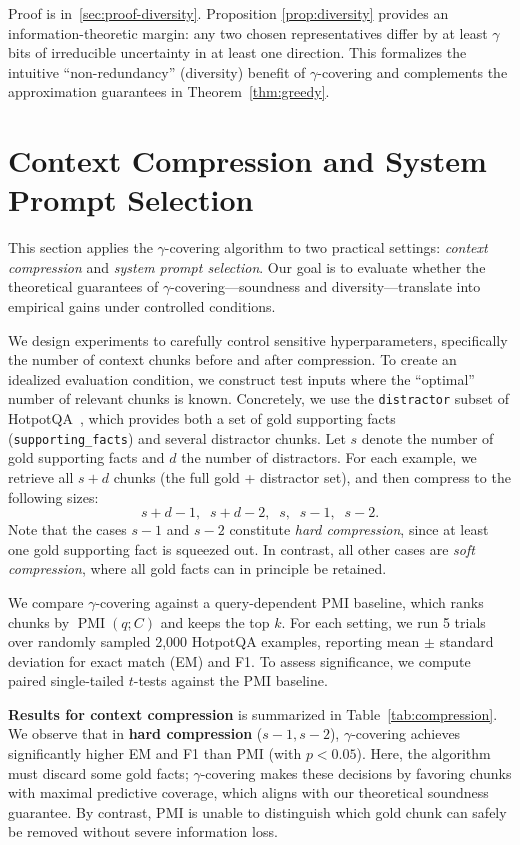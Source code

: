 \documentclass{article} %
\theoremstyle{definition}
\DeclareMathOperator{\PMI}{PMI}
\begin{document}
Proof is in~\ref{sec:proof-diversity}. Proposition \ref{prop:diversity} provides an information-theoretic margin: any two chosen representatives differ by at least $\gamma$ bits of irreducible uncertainty in at least one direction. This formalizes the intuitive “non-redundancy” (diversity) benefit of $\gamma$-covering and complements the approximation guarantees in Theorem~\ref{thm:greedy}.

\section{Context Compression and System Prompt Selection}

This section applies the $\gamma$-covering algorithm to two practical settings: \emph{context compression} and \emph{system prompt selection}. Our goal is to evaluate whether the theoretical guarantees of $\gamma$-covering---soundness and diversity---translate into empirical gains under controlled conditions.

We design experiments to carefully control sensitive hyperparameters, specifically the number of context chunks before and after compression. To create an idealized evaluation condition, we construct test inputs where the ``optimal'' number of relevant chunks is known. Concretely, we use the \texttt{distractor} subset of HotpotQA~\citep{yang2018hotpotqa}, which provides both a set of gold supporting facts (\texttt{supporting\_facts}) and several distractor chunks. Let $s$ denote the number of gold supporting facts and $d$ the number of distractors. For each example, we retrieve all $s+d$ chunks (the full gold + distractor set), and then compress to the following sizes:
\[
s+d-1,\;\; s+d-2,\;\; s,\;\; s-1,\;\; s-2.
\]
Note that the cases $s-1$ and $s-2$ constitute \emph{hard compression}, since at least one gold supporting fact is squeezed out. In contrast, all other cases are \emph{soft compression}, where all gold facts can in principle be retained.

We compare $\gamma$-covering against a query-dependent PMI baseline, which ranks chunks by $\PMI(q;C)$ and keeps the top $k$. For each setting, we run 5 trials over randomly sampled 2{,}000 HotpotQA examples, reporting mean $\pm$ standard deviation for exact match (EM) and F1. To assess significance, we compute paired single-tailed $t$-tests against the PMI baseline.

\textbf{Results for context compression} is summarized in Table~\ref{tab:compression}. We observe that in \textbf{hard compression} ($s-1, s-2$), $\gamma$-covering achieves significantly higher EM and F1 than PMI (with $p<0.05$). Here, the algorithm must discard some gold facts; $\gamma$-covering makes these decisions by favoring chunks with maximal predictive coverage, which aligns with our theoretical soundness guarantee. By contrast, PMI is unable to distinguish which gold chunk can safely be removed without severe information loss.
\end{document}
